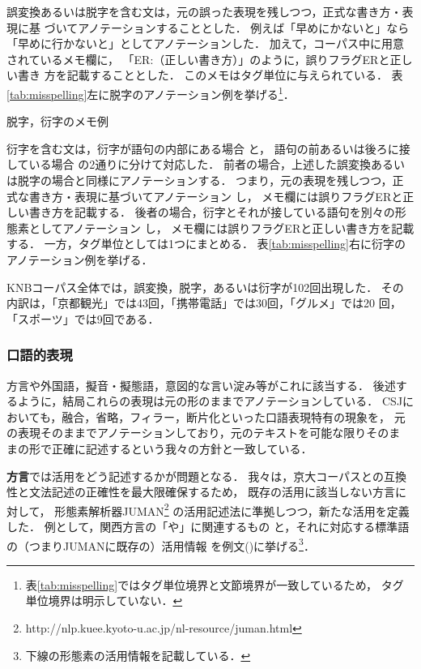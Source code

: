 \documentclass[japanese]{jnlp_JS2.0}
\begin{document}
誤変換あるいは脱字を含む文は，元の誤った表現を残しつつ，正式な書き方・表現に基
づいてアノテーションすることとした．
例えば「早めにかないと」なら「早めに行かないと」としてアノテーションした．
加えて，コーパス中に用意されているメモ欄に，
「ER:（正しい書き方）」のように，誤りフラグERと正しい書き
方を記載することとした．
このメモはタグ単位に与えられている．
表\ref{tab:misspelling}左に脱字のアノテーション例を挙げる\footnote{
表\ref{tab:misspelling}ではタグ単位境界と文節境界が一致しているため，
タグ単位境界は明示していない．}．

\begin{table}[t]
\caption{脱字，衍字のメモ例}
\label{tab:misspelling}

\end{table}

衍字を含む文は，衍字が語句の内部にある場合
と，
語句の前あるいは後ろに接している場合
の2通りに分けて対応した．
前者の場合，上述した誤変換あるいは脱字の場合と同様にアノテーションする．
つまり，元の表現を残しつつ，正式な書き方・表現に基づいてアノテーション
し，
メモ欄には誤りフラグERと正しい書き方を記載する．
後者の場合，衍字とそれが接している語句を別々の形態素としてアノテーション
し，
メモ欄には誤りフラグERと正しい書き方を記載する．
一方，タグ単位としては1つにまとめる．
表\ref{tab:misspelling}右に衍字のアノテーション例を挙げる．

KNBコーパス全体では，誤変換，脱字，あるいは衍字が102回出現した．
その内訳は，「京都観光」では43回，「携帯電話」では30回，「グルメ」では20
回，「スポーツ」では9回である．


\subsubsection{口語的表現}

方言や外国語，擬音・擬態語，意図的な言い淀み等がこれに該当する．
後述するように，結局これらの表現は元の形のままでアノテーションしている．
CSJにおいても，融合，省略，フィラー，断片化といった口語表現特有の現象を，
元の表現そのままでアノテーションしており，元のテキストを可能な限りそのま
まの形で正確に記述するという我々の方針と一致している．


\textbf{方言}では活用をどう記述するかが問題となる．
我々は，京大コーパスとの互換性と文法記述の正確性を最大限確保するため，
既存の活用に該当しない方言に対して，
形態素解析器JUMAN\footnote{http://nlp.kuee.kyoto-u.ac.jp/nl-resource/juman.html}
の活用記述法に準拠しつつ，新たな活用を定義した．
例として，関西方言の「や」に関連するもの
と，それに対応する標準語の（つまりJUMANに既存の）活用情報
を例文()に挙げる\footnote{下線の形態素の活用情報を記載している．}．
\end{document}
